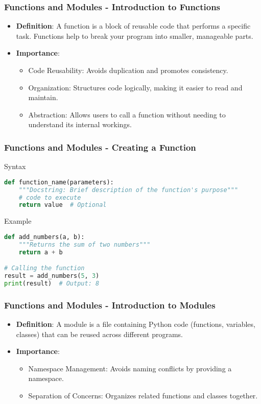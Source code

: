 \documentclass{beamer}
\begin{document}
\begin{frame}[fragile]
    \frametitle{Functions and Modules - Introduction to Functions}
    \begin{itemize}
        \item \textbf{Definition}: A function is a block of reusable code that performs a specific task. Functions help to break your program into smaller, manageable parts.
        \item \textbf{Importance}:
        \begin{itemize}
            \item Code Reusability: Avoids duplication and promotes consistency.
            \item Organization: Structures code logically, making it easier to read and maintain.
            \item Abstraction: Allows users to call a function without needing to understand its internal workings.
        \end{itemize}
    \end{itemize}
\end{frame}

\begin{frame}[fragile]
    \frametitle{Functions and Modules - Creating a Function}
    \begin{block}{Syntax}
    \begin{lstlisting}[language=Python]
def function_name(parameters):
    """Docstring: Brief description of the function's purpose"""
    # code to execute
    return value  # Optional
    \end{lstlisting}
    \end{block}

    \begin{block}{Example}
    \begin{lstlisting}[language=Python]
def add_numbers(a, b):
    """Returns the sum of two numbers"""
    return a + b

# Calling the function
result = add_numbers(5, 3)
print(result)  # Output: 8
    \end{lstlisting}
    \end{block}
\end{frame}

\begin{frame}[fragile]
    \frametitle{Functions and Modules - Introduction to Modules}
    \begin{itemize}
        \item \textbf{Definition}: A module is a file containing Python code (functions, variables, classes) that can be reused across different programs.
        \item \textbf{Importance}:
        \begin{itemize}
            \item Namespace Management: Avoids naming conflicts by providing a namespace.
            \item Separation of Concerns: Organizes related functions and classes together.
        \end{itemize}
    \end{itemize}
\end{frame}
\end{document}
